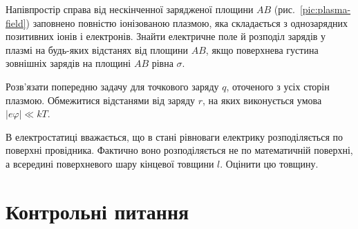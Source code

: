 \begin{problem}\label{prb:plasma-field}
	Напівпростір справа від нескінченної зарядженої площини $AB$ (рис.~\ref{pic:plasma-field}) заповнено повністю іонізованою плазмою, яка складається з однозарядних позитивних іонів і електронів. Знайти електричне поле й розподіл зарядів у плазмі на будь-яких відстанях від площини $AB$, якщо поверхнева густина зовнішніх зарядів на площині $AB$ рівна $\sigma$.
\end{problem}

\begin{problem}\label{prb:point-charge-plasma}
	Розв'язати попередню задачу для точкового заряду $q$, оточеного з усіх сторін плазмою. Обмежитися відстанями від заряду $r$, на яких виконується умова $|e\varphi| \ll kT$.
\end{problem}

\begin{problem}\label{prb:surface-layer-thickness}
	В електростатиці вважається, що в стані рівноваги електрику розподіляється по поверхні провідника. Фактично воно розподіляється не по математичній поверхні, а всередині поверхневого шару кінцевої товщини $l$. Оцінити цю товщину.
\end{problem}

\section*{Контрольні питання}

